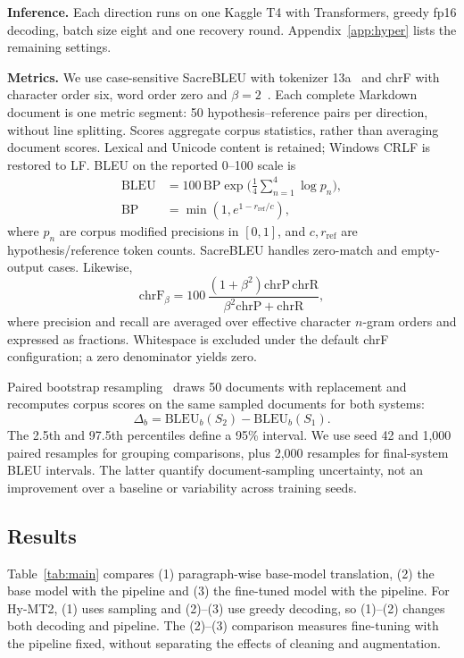 \documentclass[11pt]{article}
\begin{document}
\textbf{Inference.} Each direction runs on one Kaggle T4 with Transformers, greedy fp16 decoding, batch size eight and one recovery round. Appendix~\ref{app:hyper} lists the remaining settings.

\textbf{Metrics.} We use case-sensitive SacreBLEU with tokenizer 13a~\cite{post2018sacrebleu} and chrF with character order six, word order zero and $\beta=2$~\cite{popovic2015chrf}. Each complete Markdown document is one metric segment: 50 hypothesis--reference pairs per direction, without line splitting. Scores aggregate corpus statistics, rather than averaging document scores. Lexical and Unicode content is retained; Windows CRLF is restored to LF. BLEU on the reported 0--100 scale is~\cite{papineni2002bleu}
\begin{equation}
\begin{aligned}
\mathrm{BLEU}&=100\,\mathrm{BP}\exp\Big(\tfrac14\sum_{n=1}^{4}\log p_n\Big),\\
\mathrm{BP}&=\min(1,e^{1-r_{\mathrm{ref}}/c}),
\end{aligned}
\label{eq:bleu}
\end{equation}
where $p_n$ are corpus modified precisions in $[0,1]$, and $c,r_{\mathrm{ref}}$ are hypothesis/reference token counts. SacreBLEU handles zero-match and empty-output cases. Likewise,
\begin{equation}
\mathrm{chrF}_\beta=100\,\frac{(1+\beta^2)\mathrm{chrP}\,\mathrm{chrR}}{\beta^2\mathrm{chrP}+\mathrm{chrR}},
\label{eq:chrf}
\end{equation}
where precision and recall are averaged over effective character $n$-gram orders and expressed as fractions. Whitespace is excluded under the default chrF configuration; a zero denominator yields zero.

Paired bootstrap resampling~\cite{koehn2004significance} draws 50 documents with replacement and recomputes corpus scores on the same sampled documents for both systems:
\begin{equation}
\Delta_b=\mathrm{BLEU}_b(S_2)-\mathrm{BLEU}_b(S_1).
\label{eq:boot}
\end{equation}
The 2.5th and 97.5th percentiles define a 95\% interval. We use seed 42 and 1,000 paired resamples for grouping comparisons, plus 2,000 resamples for final-system BLEU intervals. The latter quantify document-sampling uncertainty, not an improvement over a baseline or variability across training seeds.

\subsection{Results}
Table~\ref{tab:main} compares (1) paragraph-wise base-model translation, (2) the base model with the pipeline and (3) the fine-tuned model with the pipeline. For Hy-MT2, (1) uses sampling and (2)--(3) use greedy decoding, so (1)--(2) changes both decoding and pipeline. The (2)--(3) comparison measures fine-tuning with the pipeline fixed, without separating the effects of cleaning and augmentation.
\end{document}
